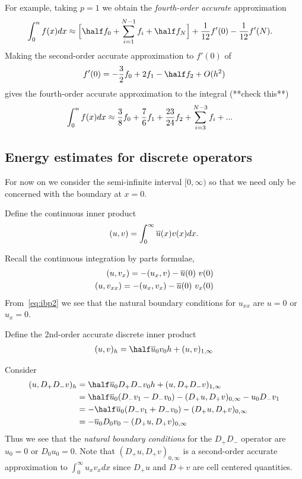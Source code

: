 For example, taking $p=1$ we obtain the {\em fourth-order accurate} approximation  
\begin{align}
\int_0^n f(x) dx &\approx\Big[ \half f_0 + \sum_{i=1}^{N-1} f_i + \half f_N \Big]
  + {1\over 12} f'(0) -  {1\over 12}f'(N). 
\end{align}  
Making the second-order accurate approximation to $f'(0)$ of 
\begin{align}
   f'(0) = -{3\over2} f_0 + 2 f_1 - \half f_2 + O(h^2)
\end{align}  
gives the fourth-order accurate approximation to the integral (**check this**)
\begin{align}
\int_0^n f(x) dx &\approx 
     {3\over 8} f_0 + {7\over6} f_1 + {23\over 24} f_2 + \sum_{i=3}^{N-3} f_i + ... 
\end{align} 



\subsection{Energy estimates for discrete operators}

For now on we consider the semi-infinite interval $[0,\infty)$ so that we need only be concerned with
the boundary at $x=0$. 


Define the continuous inner product
\begin{align}
  (u,v ) = \int_0^\infty \overline{u}(x) v(x) d x .
\end{align}

Recall the continuous integration by parts formulae,
\begin{align}
  (u,v_x ) = -(u_x,v) - \overline{u}(0)~v(0) \\
  (u,v_{xx}) = -(u_x,v_x) - \overline{u}(0)~v_x(0) \label{eq:ibp2}
\end{align}
From~\eqref{eq:ibp2} we see that the natural boundary conditions for $u_{xx}$ are
$u=0$ or $u_x=0$. 

Define the 2nd-order accurate discrete inner product
\begin{align}
  (u,v)_h  =   \half\ubar_0 v_0 h + (u,v)_{1,\infty}
\end{align}


Consider 
\begin{align}
  (u, D_+D_- v )_h  &=   \half \ubar_0 D_+D_- v_0 h + (u,D_+D_-v)_{1,\infty} \\
        &= \half \ubar_0( D_- v_1 - D_-v_0 )  - (D_+ u, D_+ v)_{0,\infty} - u_0 D_- v_1 \\
        &= - \half \ubar_0( D_- v_1 + D_-v_0 )  - (D_+ u, D_+ v)_{0,\infty} \\
        &= - \ubar_0 D_0 v_0 - (D_+ u, D_+ v)_{0,\infty}  \label{eq:dpdmsbp}
\end{align}
Thus we see that the {\em natural boundary conditions} for the $D_+D_-$ operator are
$u_0=0$ or $D_0 u_0 = 0$. Note that $(D_+ u, D_+ v)_{0,\infty}$ is a second-order accurate approximation
to $\int_0^\infty u_x v_x dx$ since $D_+u$ and $D+v$ are cell centered quantities.



